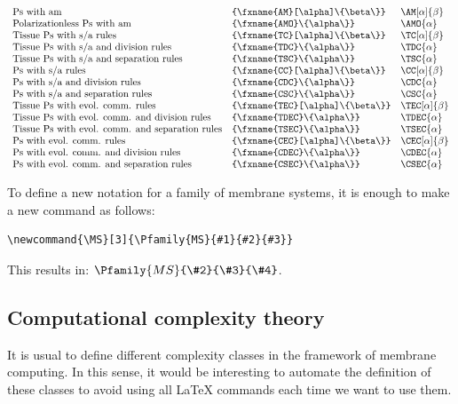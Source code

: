 \documentclass{article}
\begin{document}
$
\begin{array}{lll}
  \mbox{Ps with am} & \verb=\AM[\alpha]{\beta}= & \AM[\alpha]{\beta} \\
  \mbox{Polarizationless Ps with am} & \verb=\AMO{\alpha}= & \AMO{\alpha} \\
  \mbox{Tissue Ps with s/a rules} & \verb=\TC[\alpha]{\beta}= & \TC[\alpha]{\beta} \\
  \mbox{Tissue Ps with s/a and division rules} & \verb=\TDC{\alpha}= & \TDC{\alpha} \\
  \mbox{Tissue Ps with s/a and separation rules} & \verb=\TSC{\alpha}= & \TSC{\alpha} \\
  \mbox{Ps with s/a rules} & \verb=\CC[\alpha]{\beta}= & \CC[\alpha]{\beta} \\
  \mbox{Ps with s/a and division rules} & \verb=\CDC{\alpha}= & \CDC{\alpha} \\
  \mbox{Ps with s/a and separation rules} & \verb=\CSC{\alpha}= & \CSC{\alpha} \\
  \mbox{Tissue Ps with evol. comm. rules} & \verb=\TEC[\alpha]{\beta}= & \TEC[\alpha]{\beta} \\
  \mbox{Tissue Ps with evol. comm. and division rules} & \verb=\TDEC{\alpha}= & \TDEC{\alpha} \\
  \mbox{Tissue Ps with evol. comm. and separation rules} & \verb=\TSEC{\alpha}= & \TSEC{\alpha} \\
  \mbox{Ps with evol. comm. rules} & \verb=\CEC[\alpha]{\beta}= & \CEC[\alpha]{\beta} \\
  \mbox{Ps with evol. comm. and division rules} & \verb=\CDEC{\alpha}= & \CDEC{\alpha} \\
  \mbox{Ps with evol. comm. and separation rules} & \verb=\CSEC{\alpha}= & \CSEC{\alpha}
\end{array}
$

To define a new notation for a family of membrane systems, it is
enough to make a new command as follows:

\begin{verbatim}
\newcommand{\MS}[3]{\Pfamily{MS}{#1}{#2}{#3}}
\end{verbatim}

This results in: $\Pfamily{MS}{\#2}{\#3}{\#4}$.

\subsection{Computational complexity theory}
\label{sec:comp-compl-theory}

It is usual to define different complexity classes in the framework
of membrane computing. In this sense, it would be interesting to
automate the definition of these classes to avoid using all \LaTeX
commands each time we want to use them.
\end{document}
